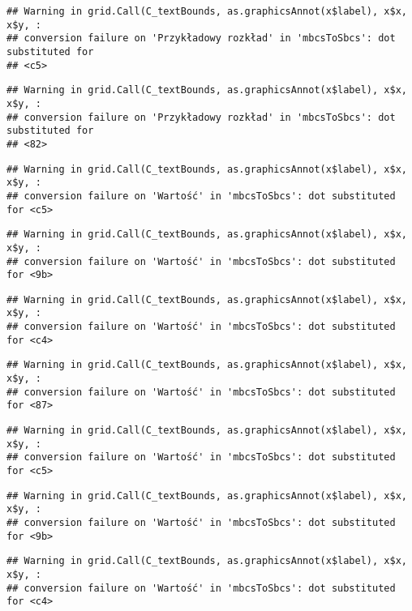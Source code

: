 \documentclass[
]{book}
\begin{document}
\begin{verbatim}
## Warning in grid.Call(C_textBounds, as.graphicsAnnot(x$label), x$x, x$y, :
## conversion failure on 'Przykładowy rozkład' in 'mbcsToSbcs': dot substituted for
## <c5>
\end{verbatim}

\begin{verbatim}
## Warning in grid.Call(C_textBounds, as.graphicsAnnot(x$label), x$x, x$y, :
## conversion failure on 'Przykładowy rozkład' in 'mbcsToSbcs': dot substituted for
## <82>
\end{verbatim}

\begin{verbatim}
## Warning in grid.Call(C_textBounds, as.graphicsAnnot(x$label), x$x, x$y, :
## conversion failure on 'Wartość' in 'mbcsToSbcs': dot substituted for <c5>
\end{verbatim}

\begin{verbatim}
## Warning in grid.Call(C_textBounds, as.graphicsAnnot(x$label), x$x, x$y, :
## conversion failure on 'Wartość' in 'mbcsToSbcs': dot substituted for <9b>
\end{verbatim}

\begin{verbatim}
## Warning in grid.Call(C_textBounds, as.graphicsAnnot(x$label), x$x, x$y, :
## conversion failure on 'Wartość' in 'mbcsToSbcs': dot substituted for <c4>
\end{verbatim}

\begin{verbatim}
## Warning in grid.Call(C_textBounds, as.graphicsAnnot(x$label), x$x, x$y, :
## conversion failure on 'Wartość' in 'mbcsToSbcs': dot substituted for <87>
\end{verbatim}

\begin{verbatim}
## Warning in grid.Call(C_textBounds, as.graphicsAnnot(x$label), x$x, x$y, :
## conversion failure on 'Wartość' in 'mbcsToSbcs': dot substituted for <c5>
\end{verbatim}

\begin{verbatim}
## Warning in grid.Call(C_textBounds, as.graphicsAnnot(x$label), x$x, x$y, :
## conversion failure on 'Wartość' in 'mbcsToSbcs': dot substituted for <9b>
\end{verbatim}

\begin{verbatim}
## Warning in grid.Call(C_textBounds, as.graphicsAnnot(x$label), x$x, x$y, :
## conversion failure on 'Wartość' in 'mbcsToSbcs': dot substituted for <c4>
\end{verbatim}
\end{document}
